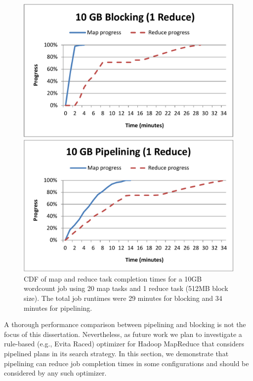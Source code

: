 \begin{figure}[t]
\ssp
\begin{minipage}{0.5\linewidth}
  \centering
        \includegraphics[width=0.95\linewidth]{figures/wc_10gb_20m1r_blocking}
\end{minipage}
\begin{minipage}{0.5\linewidth}
  \centering
        \includegraphics[width=0.95\linewidth]{figures/wc_10gb_20m1r_pipeline}
\end{minipage}
\caption{CDF of map and reduce task completion times for a 10GB wordcount job
  using 20 map tasks and 1 reduce task (512MB block size). The total job
  runtimes were 29 minutes for blocking and 34 minutes for pipelining.}
\label{fig:wc3}
\end{figure}

A thorough performance comparison between pipelining and blocking is not the
focus of this dissertation. Nevertheless, as future work we plan to investigate a rule-based (e.g., Evita Raced)
optimizer for Hadoop MapReduce that considers pipelined plans in its search strategy. In this 
section, we demonstrate that pipelining can reduce job completion times in some configurations
and should be considered by any such optimizer. 

